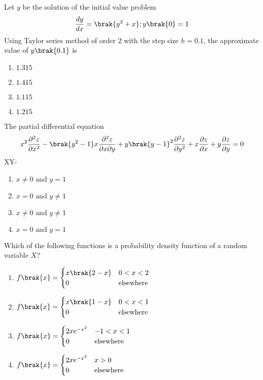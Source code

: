 \item Let $y$ be the solution of the initial value problem
\begin{align*}
\frac{dy}{dx} = \brak{y^{2} + x}; y\brak{0}=1
\end{align*}
Using Taylor series method of order $2$ with the step size $h=0.1$, the approximate value of $y\brak{0.1}$ is
\hfill{}
\begin{enumerate}
\item $1.315$
\item $1.415$
\item $1.115$
\item $1.215$
\end{enumerate}

\item The partial differential equation
\begin{align*}
x^{2} \frac{\partial^{2}{z}}{\partial{x^2}} - \brak{y^2 - 1}x\frac{\partial^{2}{z}}{\partial{x}\partial{y}} + y\brak{y-1}^{2}\frac{\partial^{2}{z}}{\partial{y^2}} + x\frac{\partial{z}}{\partial{x}} + y\frac{\partial{z}}{\partial{y}}=0 
\end{align*}
 XY- 
\hfill{}
\begin{enumerate}
\item $x\neq0 \text{ and } y=1$
\item $x=0 \text{ and } y\neq1$
\item $x\neq0 \text{ and } y\neq1$
\item $x=0 \text{ and } y=1$
\end{enumerate}

\item Which of the following functions is a probability density function of a random variable $X$?
\hfill{}
\begin{enumerate}
\item $f\brak{x} =
\begin{cases}
x\brak{2-x} & 0<x<2 \\ 0 & \text{elsewhere}
\end{cases}$
\item $f\brak{x} =
\begin{cases}
x\brak{1-x} & 0<x<1 \\ 0 & \text{elsewhere}
\end{cases}$
\item $f\brak{x} =
\begin{cases}
2xe^{-x^2} & -1<x<1 \\ 0 & \text{elsewhere}
\end{cases}$
\item $f\brak{x} =
\begin{cases}
2xe^{-x^2} & x>0 \\ 0 & \text{elsewhere}
\end{cases}$
\end{enumerate}

